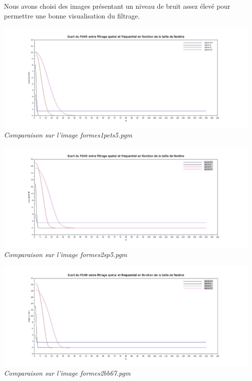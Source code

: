 \documentclass[a4,12pt]{article}
\begin{document}
Nous avons choisi des images présentant un niveau de bruit assez élevé pour permettre une bonne visualisation du filtrage.

\begin{center}
	\includegraphics[width = 170mm]{./img/1pets5sce.jpg}\\
	\textit{Comparaison sur l'image formes1pets5.pgm}
\end{center}
\vspace{1cm}

\begin{center}
	\includegraphics[width = 170mm]{./img/2sp5sce.jpg}\\
	\textit{Comparaison sur l'image formes2sp5.pgm}
\end{center}
\vspace{1cm}

\begin{center}
	\includegraphics[width = 170mm]{./img/2bb67sce.jpg}\\
	\textit{Comparaison sur l'image formes2bb67.pgm}
\end{center}
\end{document}

